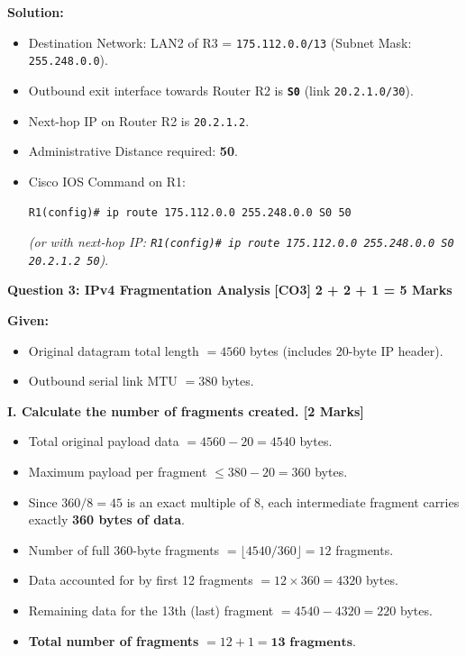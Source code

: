 \documentclass[11pt,a4paper]{article}
\newcommand{\questionheader}[3]{
    \vspace{0.35cm}
    \noindent\colorbox{qboxbg}{
        \parbox{\dimexpr\textwidth-2\fboxsep\relax}{
            \textbf{\textcolor{primary}{\large #1}} \hfill \textbf{\textcolor{accent}{[#2]}} \hfill \textbf{\textcolor{secondary}{#3 Marks}}
        }
    }
    \vspace{0.15cm}
}
\begin{document}
\textbf{Solution:}
\begin{itemize}
    \item Destination Network: LAN2 of R3 = \texttt{175.112.0.0/13} (Subnet Mask: \texttt{255.248.0.0}).
    \item Outbound exit interface towards Router R2 is \textbf{\texttt{S0}} (link \texttt{20.2.1.0/30}).
    \item Next-hop IP on Router R2 is \texttt{20.2.1.2}.
    \item Administrative Distance required: \textbf{50}.
    \item Cisco IOS Command on R1:
    \begin{center}
        \texttt{R1(config)\# ip route 175.112.0.0 255.248.0.0 S0 50}
    \end{center}
    \textit{(or with next-hop IP: \texttt{R1(config)\# ip route 175.112.0.0 255.248.0.0 S0 20.2.1.2 50})}.
\end{itemize}

\questionheader{Question 3: IPv4 Fragmentation Analysis}{CO3}{2 + 2 + 1 = 5}

\textbf{Given:}
\begin{itemize}
    \item Original datagram total length $= 4560$ bytes (includes 20-byte IP header).
    \item Outbound serial link MTU $= 380$ bytes.
\end{itemize}

\textbf{I. Calculate the number of fragments created. [2 Marks]}
\begin{itemize}
    \item Total original payload data $= 4560 - 20 = 4540$ bytes.
    \item Maximum payload per fragment $\le 380 - 20 = 360$ bytes.
    \item Since $360 / 8 = 45$ is an exact multiple of 8, each intermediate fragment carries exactly \textbf{360 bytes of data}.
    \item Number of full 360-byte fragments $= \lfloor 4540 / 360 \rfloor = 12$ fragments.
    \item Data accounted for by first 12 fragments $= 12 \times 360 = 4320$ bytes.
    \item Remaining data for the 13th (last) fragment $= 4540 - 4320 = 220$ bytes.
    \item \textbf{Total number of fragments} $= 12 + 1 = \mathbf{13\text{ fragments}}$.
\end{itemize}
\end{document}
